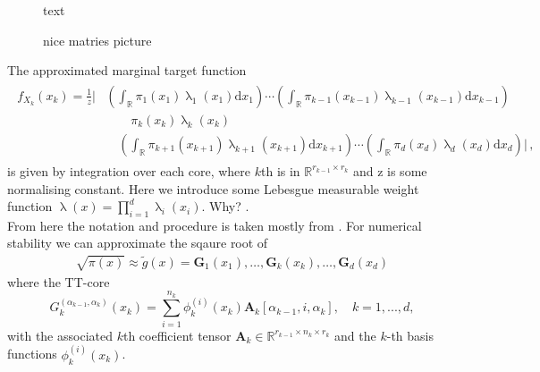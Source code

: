 \begin{figure}[ht!]
	\centering
{} 
\caption{text}
\label{key}
	
\end{figure}


\begin{figure}[ht!]
	\centering

	\caption{nice matries picture}
	\label{key}
	
\end{figure}


The approximated marginal target function
\begin{align}
	\begin{split}
	f_{X_k}(x_k) = \frac{1}{z}
	\Big|  &\left( \int_{\mathbb{R}} \pi_{1}(x_1) \uplambda_1(x_1)\text{d}x_{1} \right) \cdots \left( \int_{\mathbb{R}} \pi_{k-1}(x_{k-1}) \uplambda_{k-1}(x_{k-1}) \text{d}x_{k-1} \right) \\ & \qquad \pi_{k}(x_k)\uplambda_k(x_{k}) \\ &\quad \left( \int_{\mathbb{R}} \pi_{k+1}(x_{k+1})\uplambda_{k+1}(x_{k+1})\text{d}x_{k+1} \right) \cdots  \left( \int_{\mathbb{R}} \pi_{d}(x_d)\uplambda_d(x_{d})\text{d}x_d \right) \Big| \, ,
	\end{split} 
\end{align}
is given by integration over each core, where $k$th is in $\mathbb{R}^{r_{k-1} \times r_{k}}$ and z is some normalising constant.
Here we introduce some Lebesgue measurable weight function  $\uplambda(x) = \prod^d_{i=1} \uplambda_i(x_i)$.
Why? \cite{}.
\\


From here the notation and procedure is taken mostly from \cite{}.
For numerical stability we can approximate the sqaure root of
\begin{align}
	\sqrt{\pi(x)} \approx \tilde{g}(x) = \bm{G}_1(x_1), \dots ,  \bm{G}_k(x_k), \dots ,  \bm{G}_d(x_d)
\end{align}
where the TT-core
\begin{equation}
	G^{(\alpha_{k-1},\alpha_k)}_k(x_k) = \sum_{i=1}^{n_k} \phi^{(i)}_k(x_k) \bm{A}_k[\alpha_{k-1}, i, \alpha_k], \quad k = 1, ..., d,
\end{equation}
with the associated $k$th coefficient tensor $\bm{A}_k \in \mathbb{R}^{r_{k-1} \times n_k \times r_k}$ and the $k$-th  basis functions $\phi^{(i)}_k(x_k)$.

